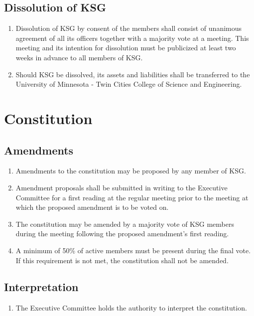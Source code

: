 \documentclass[12pt,executivepaper]{article}
\begin{document}
\subsection{Dissolution of KSG}
\begin{enumerate}
    \item Dissolution of KSG by consent of the members shall consist of unanimous
          agreement of all its officers together with a majority vote at a meeting.
          This meeting and its intention for dissolution must be publicized at least
          two weeks in advance to all members of KSG.
    \item Should KSG be dissolved, its assets and liabilities shall be transferred
          to the University of Minnesota - Twin Cities College of Science and Engineering.
\end{enumerate}

\section{Constitution}

\subsection{Amendments}
\begin{enumerate}
    \item Amendments to the constitution may be proposed by any member of KSG.
    \item Amendment proposals shall be submitted in writing to the Executive
          Committee for a first reading at the regular meeting prior to the
          meeting at which the proposed amendment is to be voted on.
    \item The constitution may be amended by a majority vote of KSG members during
          the meeting following the proposed amendment's first reading.
    \item A minimum of 50\% of active members must be present during the final vote. 
          If this requirement is not met, the constitution shall not be amended.
\end{enumerate}

\subsection{Interpretation}
\begin{enumerate}
    \item The Executive Committee holds the authority to interpret the constitution.
\end{enumerate}
\end{document}

